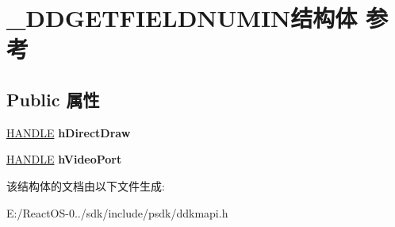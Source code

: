 \hypertarget{struct___d_d_g_e_t_f_i_e_l_d_n_u_m_i_n}{}\section{\+\_\+\+D\+D\+G\+E\+T\+F\+I\+E\+L\+D\+N\+U\+M\+I\+N结构体 参考}
\label{struct___d_d_g_e_t_f_i_e_l_d_n_u_m_i_n}
\subsection*{Public 属性}
\begin{DoxyCompactItemize}
\item 
\mbox{\label{struct___d_d_g_e_t_f_i_e_l_d_n_u_m_i_n_adf1d051b3db1c962f3a2dcb5a333e405}} 
\hyperlink{interfacevoid}{H\+A\+N\+D\+LE} {\bfseries h\+Direct\+Draw}
\item 
\mbox{\label{struct___d_d_g_e_t_f_i_e_l_d_n_u_m_i_n_a3b2c72a8b9df7891ba491fc65d690bcf}} 
\hyperlink{interfacevoid}{H\+A\+N\+D\+LE} {\bfseries h\+Video\+Port}
\end{DoxyCompactItemize}


该结构体的文档由以下文件生成\+:\begin{DoxyCompactItemize}
\item 
E\+:/\+React\+O\+S-\/0../sdk/include/psdk/ddkmapi.\+h\end{DoxyCompactItemize}
